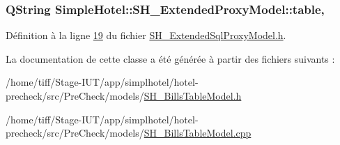 \hypertarget{classSimpleHotel_1_1SH__ExtendedProxyModel_a98cd3050230163561b4dac11a9675b8e}{
\subsubsection[{table}]{\setlength{\rightskip}{0pt plus 5cm}Q\-String Simple\-Hotel\-::\-S\-H\-\_\-\-Extended\-Proxy\-Model\-::table\hspace{0.3cm}{\ttfamily [read]}, {\ttfamily [inherited]}}}\label{classSimpleHotel_1_1SH__ExtendedProxyModel_a98cd3050230163561b4dac11a9675b8e}


Définition à la ligne \hyperlink{SH__ExtendedSqlProxyModel_8h_source_l00019}{19} du fichier \hyperlink{SH__ExtendedSqlProxyModel_8h_source}{S\-H\-\_\-\-Extended\-Sql\-Proxy\-Model.\-h}.



La documentation de cette classe a été générée à partir des fichiers suivants \-:\begin{DoxyCompactItemize}
\item 
/home/tiff/\-Stage-\/\-I\-U\-T/app/simplhotel/hotel-\/precheck/src/\-Pre\-Check/models/\hyperlink{SH__BillsTableModel_8h}{S\-H\-\_\-\-Bills\-Table\-Model.\-h}\item 
/home/tiff/\-Stage-\/\-I\-U\-T/app/simplhotel/hotel-\/precheck/src/\-Pre\-Check/models/\hyperlink{SH__BillsTableModel_8cpp}{S\-H\-\_\-\-Bills\-Table\-Model.\-cpp}\end{DoxyCompactItemize}
